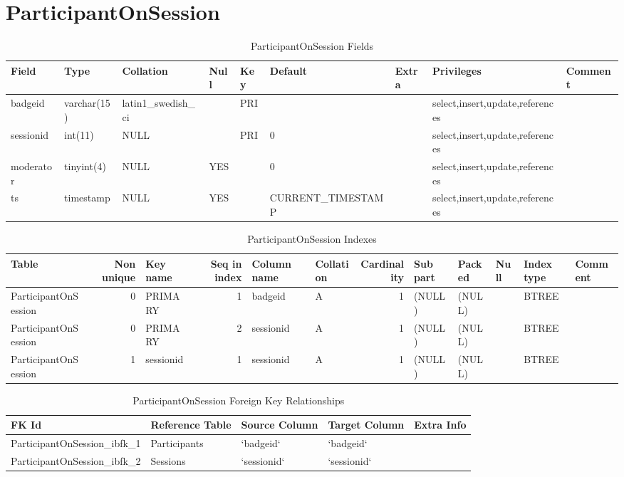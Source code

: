 \documentclass[captions=tablesignature]{scrartcl}
\begin{document}
\section{ParticipantOnSession}
\label{sec-9}

\begin{table}[htb]
\caption{\label{tbl:participantonsessionfields}ParticipantOnSession Fields}
\centering
\begin{tabular}{lllllllll}
\hline
Field & Type & Collation & Null & Key & Default & Extra & Privileges & Comment\\
\hline
badgeid & varchar(15) & latin1\_swedish\_ci &  & PRI &  &  & select,insert,update,references & \\
sessionid & int(11) & NULL &  & PRI & 0 &  & select,insert,update,references & \\
moderator & tinyint(4) & NULL & YES &  & 0 &  & select,insert,update,references & \\
ts & timestamp & NULL & YES &  & CURRENT\_TIMESTAMP &  & select,insert,update,references & \\
\hline
\end{tabular}
\end{table}

\begin{table}[htb]
\caption{\label{tbl:participantonsessionindexes}ParticipantOnSession Indexes}
\centering
\begin{tabular}{lrlrllrlllll}
\hline
Table & Non unique & Key name & Seq in index & Column name & Collation & Cardinality & Sub part & Packed & Null & Index type & Comment\\
\hline
ParticipantOnSession & 0 & PRIMARY & 1 & badgeid & A & 1 & (NULL) & (NULL) &  & BTREE & \\
ParticipantOnSession & 0 & PRIMARY & 2 & sessionid & A & 1 & (NULL) & (NULL) &  & BTREE & \\
ParticipantOnSession & 1 & sessionid & 1 & sessionid & A & 1 & (NULL) & (NULL) &  & BTREE & \\
\hline
\end{tabular}
\end{table}

\begin{table}[htb]
\caption{\label{tbl:participantonsessionfkr}ParticipantOnSession Foreign Key Relationships}
\centering
\begin{tabular}{lllll}
\hline
FK Id & Reference Table & Source Column & Target Column & Extra Info\\
\hline
ParticipantOnSession\_ibfk\_1 & Participants & `badgeid` & `badgeid` & \\
ParticipantOnSession\_ibfk\_2 & Sessions & `sessionid` & `sessionid` & \\
\hline
\end{tabular}
\end{table}
\end{document}
